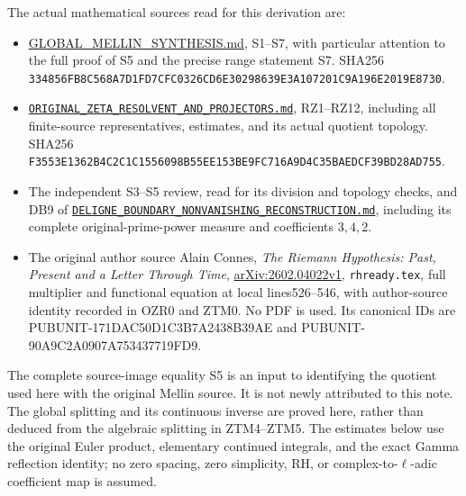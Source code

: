 The actual mathematical sources read for this derivation are:

\begin{itemize}
\tightlist
\item
  \href{https://github.com/KokunoYumeto/zeta-function-research-reader/blob/96b02efaf4511d07f33de5ea4cfb10058e905d7e/workbenches/splitzero-tandem/continuations/20260924-cohomology-weight-and-character-lifts/gct-weight-control/proofs/GLOBAL_MELLIN_SYNTHESIS.md}{GLOBAL\_MELLIN\_SYNTHESIS.md},
  S1--S7, with particular attention to the full proof of S5 and the
  precise range statement S7. SHA256
  \nolinkurl{334856FB8C568A7D1FD7CFC0326CD6E30298639E3A107201C9A196E2019E8730}.
\item
  \href{https://github.com/KokunoYumeto/zeta-function-research-reader/blob/96b02efaf4511d07f33de5ea4cfb10058e905d7e/workbenches/splitzero-tandem/continuations/20260924-cohomology-weight-and-character-lifts/gct-weight-control/proofs/ORIGINAL_ZETA_RESOLVENT_AND_PROJECTORS.md}{\nolinkurl{ORIGINAL_ZETA_RESOLVENT_AND_PROJECTORS.md}},
  RZ1--RZ12, including all finite-source representatives, estimates, and
  its actual quotient topology. SHA256
  \nolinkurl{F3553E1362B4C2C1C1556098B55EE153BE9FC716A9D4C35BAEDCF39BD28AD755}.
\item
  The independent S3--S5 review, read for its division and topology
  checks, and DB9 of
  \href{https://github.com/KokunoYumeto/zeta-function-research-reader/blob/96b02efaf4511d07f33de5ea4cfb10058e905d7e/workbenches/splitzero-tandem/continuations/20260924-cohomology-weight-and-character-lifts/gct-weight-control/proofs/DELIGNE_BOUNDARY_NONVANISHING_RECONSTRUCTION.md}{\nolinkurl{DELIGNE_BOUNDARY_NONVANISHING_RECONSTRUCTION.md}},
  including its complete original-prime-power measure and coefficients
  \(3,4,2\).
\item
  The original author source Alain Connes, \emph{The Riemann Hypothesis:
  Past, Present and a Letter Through Time},
  \href{https://arxiv.org/abs/2602.04022v1}{arXiv:2602.04022v1},
  \texttt{rhready.tex}, full multiplier and functional equation at local
  lines526--546, with author-source identity recorded in OZR0 and ZTM0.
  No PDF is used. Its canonical IDs are PUBUNIT-171DAC50D1C3B7A2438B39AE
  and PUBUNIT-90A9C2A0907A753437719FD9.
\end{itemize}

The complete source-image equality S5 is an input to identifying the
quotient used here with the original Mellin source. It is not newly
attributed to this note. The global splitting and its continuous inverse
are proved here, rather than deduced from the algebraic splitting in
ZTM4--ZTM5. The estimates below use the original Euler product,
elementary continued integrals, and the exact Gamma reflection identity;
no zero spacing, zero simplicity, RH, or complex-to-\(\ell\)-adic
coefficient map is assumed.


